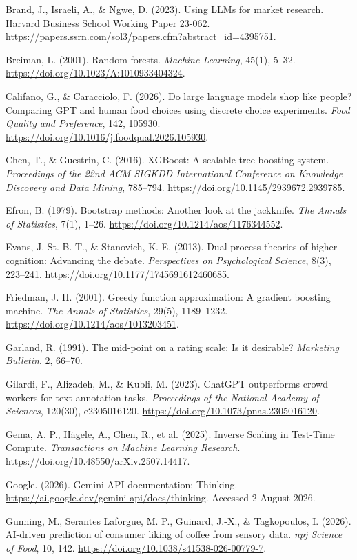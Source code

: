 \documentclass[11pt]{article}
\begin{document}
\noindent Brand, J., Israeli, A., \& Ngwe, D. (2023). Using LLMs for market
research. Harvard Business School Working Paper 23-062.
\url{https://papers.ssrn.com/sol3/papers.cfm?abstract_id=4395751}.

\noindent Breiman, L. (2001). Random forests. \emph{Machine Learning}, 45(1),
5--32. \url{https://doi.org/10.1023/A:1010933404324}.

\noindent Califano, G., \& Caracciolo, F. (2026). Do large language models shop
like people? Comparing GPT and human food choices using discrete choice
experiments. \emph{Food Quality and Preference}, 142, 105930.
\url{https://doi.org/10.1016/j.foodqual.2026.105930}.

\noindent Chen, T., \& Guestrin, C. (2016). XGBoost: A scalable tree boosting
system. \emph{Proceedings of the 22nd ACM SIGKDD International Conference on
Knowledge Discovery and Data Mining}, 785--794.
\url{https://doi.org/10.1145/2939672.2939785}.

\noindent Efron, B. (1979). Bootstrap methods: Another look at the jackknife.
\emph{The Annals of Statistics}, 7(1), 1--26.
\url{https://doi.org/10.1214/aos/1176344552}.

\noindent Evans, J. St. B. T., \& Stanovich, K. E. (2013). Dual-process
theories of higher cognition: Advancing the debate. \emph{Perspectives on
Psychological Science}, 8(3), 223--241.
\url{https://doi.org/10.1177/1745691612460685}.

\noindent Friedman, J. H. (2001). Greedy function approximation: A gradient
boosting machine. \emph{The Annals of Statistics}, 29(5), 1189--1232.
\url{https://doi.org/10.1214/aos/1013203451}.

\noindent Garland, R. (1991). The mid-point on a rating scale: Is it
desirable? \emph{Marketing Bulletin}, 2, 66--70.

\noindent Gilardi, F., Alizadeh, M., \& Kubli, M. (2023). ChatGPT outperforms
crowd workers for text-annotation tasks. \emph{Proceedings of the National
Academy of Sciences}, 120(30), e2305016120.
\url{https://doi.org/10.1073/pnas.2305016120}.

\noindent Gema, A. P., H\"agele, A., Chen, R., et al. (2025). Inverse
Scaling in Test-Time Compute. \emph{Transactions on Machine Learning Research}.
\url{https://doi.org/10.48550/arXiv.2507.14417}.

\noindent Google. (2026). Gemini API documentation: Thinking.
\url{https://ai.google.dev/gemini-api/docs/thinking}. Accessed 2 August 2026.

\noindent Gunning, M., Serantes Laforgue, M. P., Guinard, J.-X., \& Tagkopoulos,
I. (2026). AI-driven prediction of consumer liking of coffee from sensory data.
\emph{npj Science of Food}, 10, 142.
\url{https://doi.org/10.1038/s41538-026-00779-7}.
\end{document}
